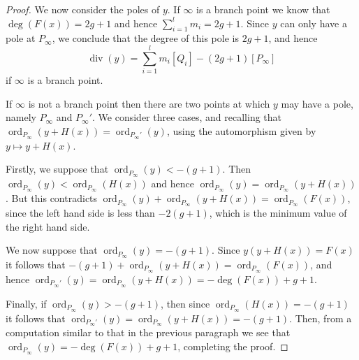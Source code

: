 \documentclass[draft, 11pt]{article} %
\theoremstyle{plain}
\theoremstyle{remark}
\DeclareMathOperator{\ord}{ord}
\DeclareMathOperator{\di}{div}
\begin{document}
\begin{proof}
We now consider the poles of $y$.
If $\infty$ is a branch point we know that $\deg(F(x)) = 2g+1$ and hence $\sum_{i=1}^l m_i = 2g+1$.
Since $y$ can only have a pole at $P_\infty$, we conclude that the degree of this pole is $2g+1$, and hence
\[
\di(y) = \sum_{i=1}^l m_i [Q_i] - (2g+1)[P_\infty]
\]
if $\infty$ is a branch point.

If $\infty$ is not a branch point then there are two points at which $y$ may have a pole, namely $P_\infty$ and $P_\infty'$.
We consider three cases, and recalling that $\ord_{P_\infty}(y + H(x)) = \ord_{P_\infty'}(y)$, using the automorphism given by $y \mapsto y+H(x)$.


Firstly, we suppose that $\ord_{P_\infty}(y) < -(g+1)$.
Then $\ord_{P_\infty}(y) < \ord_{P_\infty}(H(x))$ and hence $ \ord_{P_\infty}(y) = \ord_{P_\infty}(y+H(x))$.
But this contradicts $\ord_{P_\infty}(y) + \ord_{P_\infty}(y+H(x)) = \ord_{P_\infty}(F(x))$, since the left hand side is less than $-2(g+1)$, which is the minimum value of the right hand side.

We now suppose that $\ord_{P_\infty} (y) = -(g+1)$. Since $y(y+H(x)) = F(x)$ it follows that $-(g+1) + \ord_{P_\infty}(y+H(x)) = \ord_{P_\infty}(F(x))$, and hence $\ord_{P_\infty'}(y) = \ord_{P_\infty}(y+H(x)) = -\deg(F(x)) + g + 1$.

Finally, if $\ord_{P_\infty}(y) > -(g+1)$, then since $\ord_{P_\infty}(H(x)) = -(g+1)$ it follows that $\ord_{P_\infty'}(y) = \ord_{P_\infty} (y+H(x)) = -(g+1)$.
Then, from a computation similar to that in the previous paragraph we see that $\ord_{P_\infty}(y) = -\deg(F(x)) + g +1$, completing the proof.
\end{proof}
\end{document}
